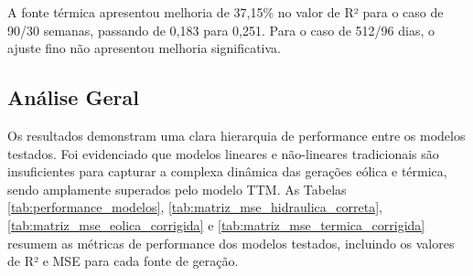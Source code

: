 A fonte térmica apresentou melhoria de 37,15\% no valor de R² para o caso de 90/30 semanas, passando de 0,183 para 0,251.
Para o caso de 512/96 dias, o ajuste fino não apresentou melhoria significativa. 

\subsection{Análise Geral}
Os resultados demonstram uma clara hierarquia de performance entre os modelos testados. Foi evidenciado que modelos 
lineares e não-lineares tradicionais são insuficientes para capturar a complexa dinâmica das gerações eólica e térmica, sendo 
amplamente superados pelo modelo TTM. As Tabelas \ref{tab:performance_modelos}, \ref{tab:matriz_mse_hidraulica_correta}, 
\ref{tab:matriz_mse_eolica_corrigida} e \ref{tab:matriz_mse_termica_corrigida} resumem as métricas de performance dos modelos 
testados, incluindo os valores de R² e MSE para cada fonte de geração.

